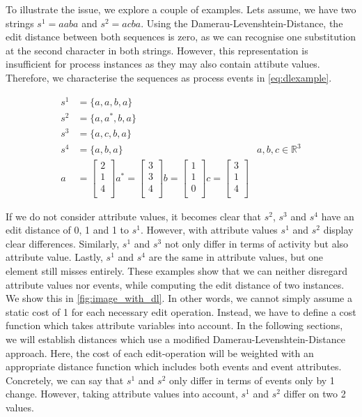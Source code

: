 \documentclass[./../../paper.tex]{subfiles}
\begin{document}
To illustrate the issue, we explore a couple of examples. Lets assume, we have two strings $s^1=aaba$ and $s^2=acba$. Using the Damerau-Levenshtein-Distance, the edit distance between both sequences is zero, as we can recognise one substitution at the second character in both strings. However, this representation is insufficient for process instances as they may also contain attibute values. Therefore, we characterise the sequences as process events in \autoref{eq:dlexample}. 

\begin{align}
    \label{eq:dlexample}
    s^1 &=\{a,a,b,a\} \\
    s^2 &=\{a,a^*,b,a\}\\
    s^3 &=\{a,c,b,a\}\\
    s^4 &=\{a,b,a\}
    &a,b,c \in \mathbb{R}^3\\
    a &= \begin{bmatrix}
        2\\
        1\\
        4\\
    \end{bmatrix}
    a^* = \begin{bmatrix}
        3\\
        3\\
        4\\
    \end{bmatrix}
    b = \begin{bmatrix}
        1\\
        1\\
        0\\
    \end{bmatrix}
    c = \begin{bmatrix}
        3\\
        1\\
        4\\
    \end{bmatrix}
\end{align}

\noindent If we do not consider attribute values, it becomes clear that $s^2$, $s^3$ and $s^4$ have an edit distance of 0, 1 and 1 to $s^1$. However, with attribute values $s^1$ and $s^2$ display clear differences. Similarly, $s^1$ and $s^3$ not only differ in terms of activity but also attribute value. Lastly, $s^1$ and $s^4$ are the same in attribute values, but one element still misses entirely. These examples show that we can neither disregard attribute values nor events, while computing the edit distance of two \glspl{instance}. We show this in \autoref{fig:image_with_dl}. In other words, we cannot simply assume a static cost of 1 for each necessary edit operation. Instead, we have to define a cost function which takes attribute variables into account. In the following sections, we will establish distances which use a modified Damerau-Levenshtein-Distance approach. Here, the cost of each edit-operation will be weighted with an appropriate distance function which includes both events and event attributes. Concretely, we can say that $s^1$ and $s^2$ only differ in terms of events only by 1 change. However, taking attribute values into account, $s^1$ and $s^2$ differ on two 2 values. 
\end{document}
